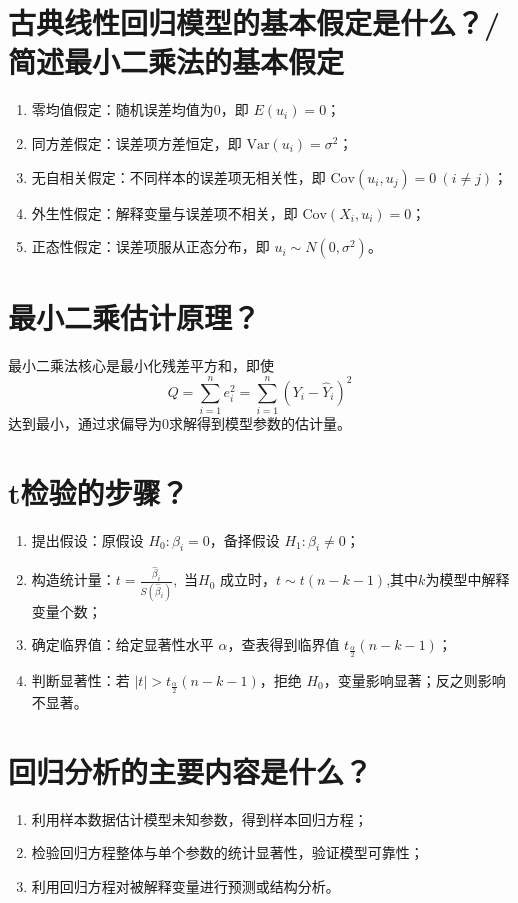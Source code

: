 \documentclass{ctexart}
\begin{document}
\section{古典线性回归模型的基本假定是什么？/简述最小二乘法的基本假定}
\begin{enumerate}
\item 零均值假定：随机误差均值为0，即 $E(u_i)=0$；
\item 同方差假定：误差项方差恒定，即 $\text{Var}(u_i)=\sigma^2$；
\item 无自相关假定：不同样本的误差项无相关性，即 $\text{Cov}(u_i,u_j)=0\ (i\neq j)$；
\item 外生性假定：解释变量与误差项不相关，即 $\text{Cov}(X_i,u_i)=0$；
\item 正态性假定：误差项服从正态分布，即 $u_i \sim N(0,\sigma^2)$。
\end{enumerate}

\section{最小二乘估计原理？}
最小二乘法核心是最小化残差平方和，即使
$$
Q = \sum_{i=1}^n e_i^2 = \sum_{i=1}^n (Y_i - \hat{Y}_i)^2 
$$
达到最小，通过求偏导为0求解得到模型参数的估计量。

\section{t检验的步骤？}
\begin{enumerate}
\item 提出假设：原假设 $H_0: \beta_i=0$，备择假设 $H_1: \beta_i\neq0$；
\item 构造统计量：$t = \frac{\hat{\beta}_i}{S(\hat{\beta}_i)},$
当$H_0$ 成立时，$t \sim t(n-k-1)$,其中$k$为模型中解释变量个数；
\item 确定临界值：给定显著性水平 $\alpha$，查表得到临界值 $t_{\frac{\alpha}{2}}(n-k-1)$；
\item 判断显著性：若 $|t|>t_{\frac{\alpha}{2}}(n-k-1)$，拒绝 $H_0$，变量影响显著；反之则影响不显著。
\end{enumerate}

\section{回归分析的主要内容是什么？}
\begin{enumerate}
\item 利用样本数据估计模型未知参数，得到样本回归方程；
\item 检验回归方程整体与单个参数的统计显著性，验证模型可靠性；
\item 利用回归方程对被解释变量进行预测或结构分析。
\end{enumerate}
\end{document}
